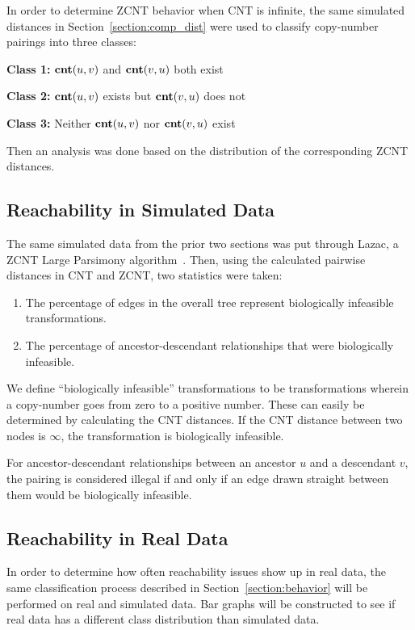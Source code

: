 In order to determine ZCNT behavior when CNT is infinite, the same simulated distances in Section~\ref{section:comp_dist} were used to classify copy-number pairings into three classes: 


{\bf Class 1:} $\textbf{cnt}(u, v)$ and $\textbf{cnt}(v, u)$ both exist

{\bf Class 2:} $\textbf{cnt}(u, v)$ exists but $\textbf{cnt}(v, u)$ does not 

{\bf Class 3:} Neither $\textbf{cnt}(u, v)$ nor $\textbf{cnt}(v, u)$ exist 

Then an analysis was done based on the distribution of the corresponding ZCNT distances. 


\subsection{Reachability in Simulated Data}\label{section:simulated_reachability}
The same simulated data from the prior two sections was put through Lazac, a ZCNT Large Parsimony algorithm~\cite{zcnt_paper}. Then, using the calculated pairwise distances in CNT and ZCNT, two statistics were taken: 

\begin{enumerate}
    \item The percentage of edges in the overall tree represent biologically infeasible transformations.
    \item The percentage of ancestor-descendant relationships that were biologically infeasible.
\end{enumerate}

We define ``biologically infeasible'' transformations to be transformations wherein a copy-number goes from zero to a positive number. These can easily be determined by calculating the CNT distances. If the CNT distance between two nodes is $\infty$, the transformation is biologically infeasible. 

For ancestor-descendant relationships between an ancestor $u$ and a descendant $v$, the pairing is considered illegal if and only if an edge drawn straight between them would be biologically infeasible.

\subsection{Reachability in Real Data}\label{section:real_reachability}
In order to determine how often reachability issues show up in real data, the same classification process described in Section~\ref{section:behavior} will be performed on real and simulated data. Bar graphs will be constructed to see if real data has a different class distribution than simulated data. 

